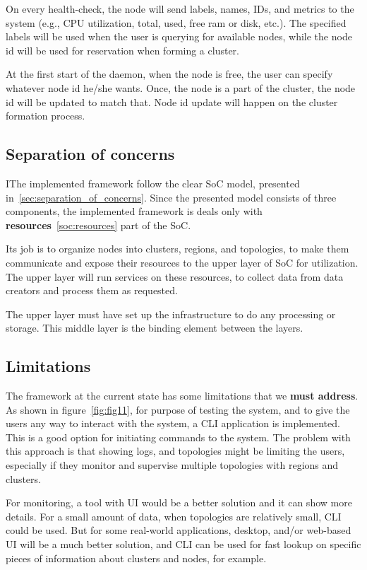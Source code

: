 On every health-check, the node will send labels, names, IDs, and metrics to the system (e.g., CPU utilization, total, used, free ram or disk, etc.). The specified labels will be used when the user is querying for available nodes, while the node id will be used for reservation when forming a cluster.

At the first start of the daemon, when the node is free, the user can specify whatever node id he/she wants. Once, the node is a part of the cluster, the node id will be updated to match that. Node id update will happen on the cluster formation process.
%
%
\subsection{Separation of concerns}\label{sec:framework_SoC}
%
IThe implemented framework follow the clear SoC model, presented in~\ref{sec:separation_of_concerns}. Since the presented model consists of three components, the implemented framework is deals only with \textbf{resources}~\ref{soc:resources} part of the SoC. 

Its job is to organize nodes into clusters, regions, and topologies, to make them communicate and expose their resources to the upper layer of SoC for utilization. The upper layer will run services on these resources, to collect data from data creators and process them as requested.

The upper layer must have set up the infrastructure to do any processing or storage. This middle layer is the binding element between the layers.
%
%
\subsection{Limitations}\label{sec:framework_limits}
% 
The framework at the current state has some limitations that we \textbf{must address}. As shown in figure~\ref{fig:fig11}, for purpose of testing the system, and to give the users any way to interact with the system, a CLI application is implemented. This is a good option for initiating commands to the system. The problem with this approach is that showing logs, and topologies might be limiting the users, especially if they monitor and supervise multiple topologies with regions and clusters.

For monitoring, a tool with UI would be a better solution and it can show more details. For a small amount of data, when topologies are relatively small, CLI could be used. But for some real-world applications, desktop, and/or web-based UI will be a much better solution, and CLI can be used for fast lookup on specific pieces of information about clusters and nodes, for example.

